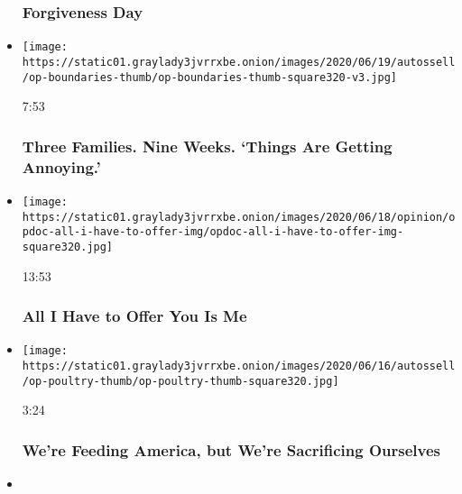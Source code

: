 \begin{itemize}
  \hypertarget{forgiveness-day}{%
  \subsubsection{Forgiveness Day}\label{forgiveness-day}}
\item
  \href{https://www.nytimes3xbfgragh.onion/video/opinion/100000007184142/coronavirus-pandemic-parenting.html?action=click\&module=video-series-bar\&region=header\&pgtype=Article\&playlistId=video/opinion}{}

  \texttt{[image: https://static01.graylady3jvrrxbe.onion/images/2020/06/19/autossell/op-boundaries-thumb/op-boundaries-thumb-square320-v3.jpg]}

  7:53

  \hypertarget{three-families-nine-weeks-things-are-getting-annoying}{%
  \subsubsection{Three Families. Nine Weeks. `Things Are Getting
  Annoying.'}\label{three-families-nine-weeks-things-are-getting-annoying}}
\item
  \href{https://www.nytimes3xbfgragh.onion/video/opinion/100000007133685/all-i-have-to-offer-you-is-me.html?action=click\&module=video-series-bar\&region=header\&pgtype=Article\&playlistId=video/opinion}{}

  \texttt{[image: https://static01.graylady3jvrrxbe.onion/images/2020/06/18/opinion/opdoc-all-i-have-to-offer-img/opdoc-all-i-have-to-offer-img-square320.jpg]}

  13:53

  \hypertarget{all-i-have-to-offer-you-is-me}{%
  \subsubsection{All I Have to Offer You Is
  Me}\label{all-i-have-to-offer-you-is-me}}
\item
  \href{https://www.nytimes3xbfgragh.onion/video/opinion/100000007184138/coronavirus-tyson-poultry.html?action=click\&module=video-series-bar\&region=header\&pgtype=Article\&playlistId=video/opinion}{}

  \texttt{[image: https://static01.graylady3jvrrxbe.onion/images/2020/06/16/autossell/op-poultry-thumb/op-poultry-thumb-square320.jpg]}

  3:24

  \hypertarget{were-feeding-america-but-were-sacrificing-ourselves}{%
  \subsubsection{We're Feeding America, but We're Sacrificing
  Ourselves}\label{were-feeding-america-but-were-sacrificing-ourselves}}
\item
  \href{https://www.nytimes3xbfgragh.onion/video/opinion/100000007179746/hate-crime-bill-ahmaud-arbery.html?action=click\&module=video-series-bar\&region=header\&pgtype=Article\&playlistId=video/opinion}{}


\end{itemize}
